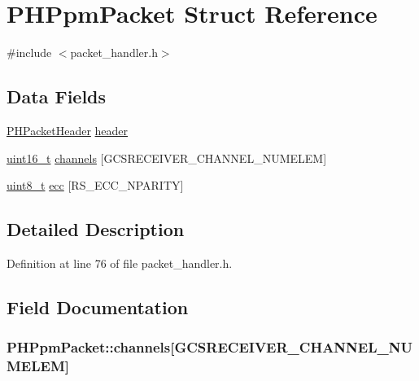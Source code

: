 \hypertarget{struct_p_h_ppm_packet}{\section{P\-H\-Ppm\-Packet Struct Reference}
\label{struct_p_h_ppm_packet}
}


{\ttfamily \#include $<$packet\-\_\-handler.\-h$>$}

\subsection*{Data Fields}
\begin{DoxyCompactItemize}
\item 
\hyperlink{struct_p_h_packet_header}{P\-H\-Packet\-Header} \hyperlink{struct_p_h_ppm_packet_a6dbe9e28bb634aadd35b5c4501589532}{header}
\item 
\hyperlink{stdint_8h_a273cf69d639a59973b6019625df33e30}{uint16\-\_\-t} \hyperlink{struct_p_h_ppm_packet_a47b34df90a9b106c7be077456b3ba1b2}{channels} \mbox{[}G\-C\-S\-R\-E\-C\-E\-I\-V\-E\-R\-\_\-\-C\-H\-A\-N\-N\-E\-L\-\_\-\-N\-U\-M\-E\-L\-E\-M\mbox{]}
\item 
\hyperlink{stdint_8h_aba7bc1797add20fe3efdf37ced1182c5}{uint8\-\_\-t} \hyperlink{struct_p_h_ppm_packet_a4cd9aaabbc588410a6ccc2d333fc224a}{ecc} \mbox{[}R\-S\-\_\-\-E\-C\-C\-\_\-\-N\-P\-A\-R\-I\-T\-Y\mbox{]}
\end{DoxyCompactItemize}


\subsection{Detailed Description}


Definition at line 76 of file packet\-\_\-handler.\-h.



\subsection{Field Documentation}
\hypertarget{struct_p_h_ppm_packet_a47b34df90a9b106c7be077456b3ba1b2}{
\subsubsection[{channels}]{ P\-H\-Ppm\-Packet\-::channels\mbox{[}G\-C\-S\-R\-E\-C\-E\-I\-V\-E\-R\-\_\-\-C\-H\-A\-N\-N\-E\-L\-\_\-\-N\-U\-M\-E\-L\-E\-M\mbox{]}}}\label{struct_p_h_ppm_packet_a47b34df90a9b106c7be077456b3ba1b2}


